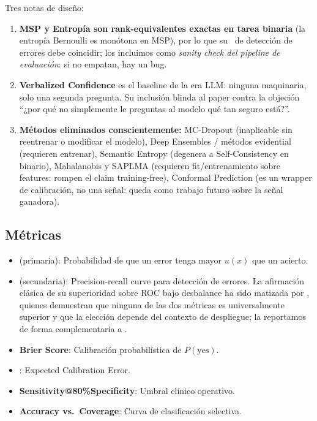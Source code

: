 \documentclass[12pt,a4paper]{article}
\newcommand{\AUROC}{\mathrm{AUROC}}
\newcommand{\AUPRC}{\mathrm{AUPRC}}
\newcommand{\ECE}{\mathrm{ECE}}
\begin{document}
Tres notas de diseño:

\begin{enumerate}
    \item \textbf{MSP y Entropía son rank-equivalentes exactas en tarea binaria} (la entropía Bernoulli es monótona en MSP), por lo que su \AUROC\ de detección de errores debe coincidir; los incluimos como \emph{sanity check del pipeline de evaluación}: si no empatan, hay un bug.
    \item \textbf{Verbalized Confidence} \citep{kadavath2022language, lin2022teaching} es el baseline de la era LLM: ninguna maquinaria, solo una segunda pregunta.
    Su inclusión blinda al paper contra la objeción ``¿por qué no simplemente le preguntas al modelo qué tan seguro está?''.
    \item \textbf{Métodos eliminados conscientemente:} MC-Dropout (inaplicable sin reentrenar o modificar el modelo), Deep Ensembles / métodos evidential (requieren entrenar), Semantic Entropy (degenera a Self-Consistency en binario), Mahalanobis y SAPLMA (requieren fit/entrenamiento sobre features: rompen el claim training-free), Conformal Prediction (es un wrapper de calibración, no una señal: queda como trabajo futuro sobre la señal ganadora).
\end{enumerate}

\subsection{Métricas}

\begin{itemize}[leftmargin=2em]
    \item \textbf{\AUROC} (primaria): Probabilidad de que un error tenga mayor $u(x)$ que un acierto.

    \item \textbf{\AUPRC} (secundaria): Precision-recall curve para detección de errores.
    La afirmación clásica de su superioridad sobre ROC bajo desbalance \citep{saito2015precision} ha sido matizada por \citet{mcdermott2024auroc}, quienes demuestran que ninguna de las dos métricas es universalmente superior y que la elección depende del contexto de despliegue; la reportamos de forma complementaria a \AUROC.

    \item \textbf{Brier Score}: Calibración probabilística de $P(\text{yes})$.

    \item \textbf{\ECE}: Expected Calibration Error.

    \item \textbf{Sensitivity@80\%Specificity}: Umbral clínico operativo.

    \item \textbf{Accuracy vs.~Coverage}: Curva de clasificación selectiva.
\end{itemize}
\end{document}
